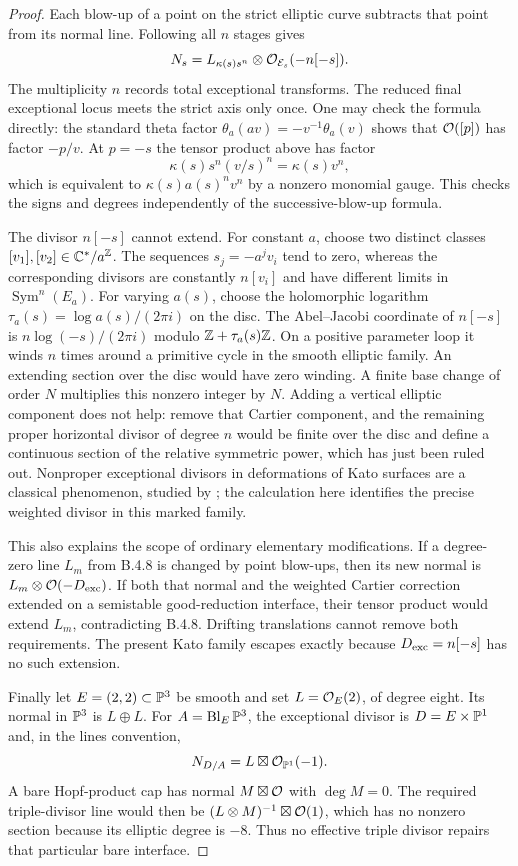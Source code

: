 \begin{proof}
Each blow-up of a point on the strict elliptic curve subtracts that
point from its normal line. Following all $n$ stages gives
\[
 N_s=L_{\kappa(s)s^n}\otimes\mathcal O_{\mathcal E_s}(-n[-s]).
\]
The multiplicity $n$ records total exceptional transforms.
The reduced final exceptional locus meets the strict axis only once.
One may check the formula directly: the standard theta factor
$\theta_a(av)=-v^{-1}\theta_a(v)$ shows that $\mathcal O([p])$
has factor $-p/v$. At $p=-s$ the tensor product above has factor
\[
 \kappa(s)s^n(v/s)^n=\kappa(s)v^n,
\]
which is equivalent to $\kappa(s)a(s)^n v^n$ by a nonzero monomial
gauge. This checks the signs and degrees independently of the
successive-blow-up formula.

The divisor $n[-s]$ cannot extend. For constant $a$, choose two
distinct classes $[v_1],[v_2]\in\mathbb C^*/a^\mathbb Z$.
The sequences $s_j=-a^jv_i$ tend to zero, whereas the corresponding
divisors are constantly $n[v_i]$ and have different limits in
$\operatorname{Sym}^n(E_a)$.
For varying $a(s)$, choose the holomorphic logarithm
$\tau_a(s)=\log a(s)/(2\pi i)$ on the disc.
The Abel--Jacobi coordinate of $n[-s]$ is
$n\log(-s)/(2\pi i)$ modulo $\mathbb Z+\tau_a(s)\mathbb Z$.
On a positive parameter loop it winds $n$ times around a primitive
cycle in the smooth elliptic family. An extending section over the
disc would have zero winding. A finite base change of order $N$
multiplies this nonzero integer by $N$.
Adding a vertical elliptic component does not help: remove that
Cartier component, and the remaining proper horizontal divisor of
degree $n$ would be finite over the disc and define a continuous
section of the relative symmetric power, which has just been ruled
out. Nonproper exceptional divisors in deformations of Kato surfaces
are a classical phenomenon, studied by
\citet[Section 1.2]{DlousskyTeleman2012AB}; the calculation here
identifies the precise weighted divisor in this marked family.

This also explains the scope of ordinary elementary modifications.
If a degree-zero line $L_m$ from B.4.8 is changed by point blow-ups,
then its new normal is $L_m\otimes\mathcal O(-D_{\rm exc})$.
If both that normal and the weighted Cartier correction extended on
a semistable good-reduction interface, their tensor product would
extend $L_m$, contradicting B.4.8. Drifting translations cannot
remove both requirements. The present Kato family escapes exactly
because $D_{\rm exc}=n[-s]$ has no such extension.

Finally let $E=(2,2)\subset\mathbb P^3$ be smooth and set
$L=\mathcal O_E(2)$, of degree eight. Its normal in $\mathbb P^3$ is
$L\oplus L$. For $A=\operatorname{Bl}_E\mathbb P^3$, the exceptional
divisor is $D=E\times\mathbb P^1$ and, in the lines convention,
\[
 N_{D/A}=L\boxtimes\mathcal O_{\mathbb P^1}(-1).
\]
A bare Hopf-product cap has normal $M\boxtimes\mathcal O$ with
$\deg M=0$. The required triple-divisor line would then be
$(L\otimes M)^{-1}\boxtimes\mathcal O(1)$, which has no nonzero section
because its elliptic degree is $-8$. Thus no effective triple divisor
repairs that particular bare interface.


\end{proof}
